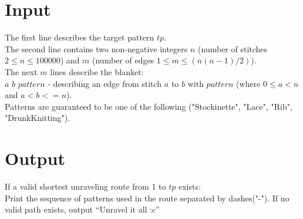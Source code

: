 \section*{Input}
The first line describes the target pattern $tp$.\\
The second line contains two non-negative integers $n$ (number of stitches $2\leq n\leq 100000$) and $m$ (number of edges $1 \leq m \leq (n(n-1)/2)$).\\
The next $m$  lines describe the blanket: \\
$a$   $b$  $pattern$ - describing an edge from stitch $a$ to $b$ with $pattern$ (where $0\leq a < n$ and $a < b <= n$). \\
Patterns are guaranteed to be one of the following ("Stockinette", "Lace", "Rib", "DrunkKnitting").
\section*{Output}
If a valid shortest unraveling route from 1 to $tp$ exists: \\
Print the sequence of patterns used in the route separated by dashes("-").
If no valid path exists, output “Unravel it all :c”